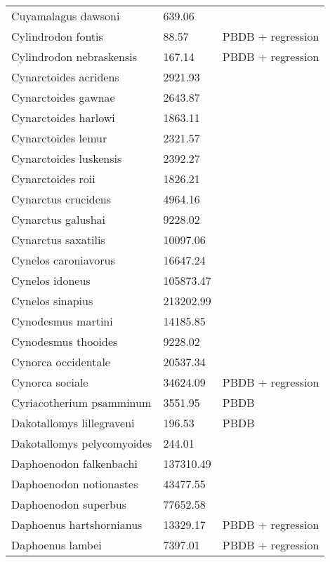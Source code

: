 \documentclass{article}
\begin{document}
\begin{center}
\begin{longtable}{p{} p{} p{}}
    Cuyamalagus dawsoni & 639.06 & \cite{Tomiya2013} \\ 
    Cylindrodon fontis & 88.57 & PBDB + regression \\ 
    Cylindrodon nebraskensis & 167.14 & PBDB + regression \\ 
    Cynarctoides acridens & 2921.93 & \cite{Tomiya2013} \\ 
    Cynarctoides gawnae & 2643.87 & \cite{Tomiya2013} \\ 
    Cynarctoides harlowi & 1863.11 & \cite{Tomiya2013} \\ 
    Cynarctoides lemur & 2321.57 & \cite{Tomiya2013} \\ 
    Cynarctoides luskensis & 2392.27 & \cite{Tomiya2013} \\ 
    Cynarctoides roii & 1826.21 & \cite{Tomiya2013} \\ 
    Cynarctus crucidens & 4964.16 & \cite{Tomiya2013} \\ 
    Cynarctus galushai & 9228.02 & \cite{Tomiya2013} \\ 
    Cynarctus saxatilis & 10097.06 & \cite{Tomiya2013} \\ 
    Cynelos caroniavorus & 16647.24 & \cite{Tomiya2013} \\ 
    Cynelos idoneus & 105873.47 & \cite{Tomiya2013} \\ 
    Cynelos sinapius & 213202.99 & \cite{Tomiya2013} \\ 
    Cynodesmus martini & 14185.85 & \cite{Tomiya2013} \\ 
    Cynodesmus thooides & 9228.02 & \cite{Tomiya2013} \\ 
    Cynorca occidentale & 20537.34 & \cite{Tomiya2013} \\ 
    Cynorca sociale & 34624.09 & PBDB + regression \\ 
    Cyriacotherium psamminum & 3551.95 & PBDB \\ 
    Dakotallomys lillegraveni & 196.53 & PBDB \\ 
    Dakotallomys pelycomyoides & 244.01 & \cite{Mihlbachler2006} \\ 
    Daphoenodon falkenbachi & 137310.49 & \cite{Tomiya2013} \\ 
    Daphoenodon notionastes & 43477.55 & \cite{Tomiya2013} \\ 
    Daphoenodon superbus & 77652.58 & \cite{Tomiya2013} \\ 
    Daphoenus hartshornianus & 13329.17 & PBDB + regression \\ 
    Daphoenus lambei & 7397.01 & PBDB + regression \\ 

\end{longtable}
\end{center}
\end{document}
